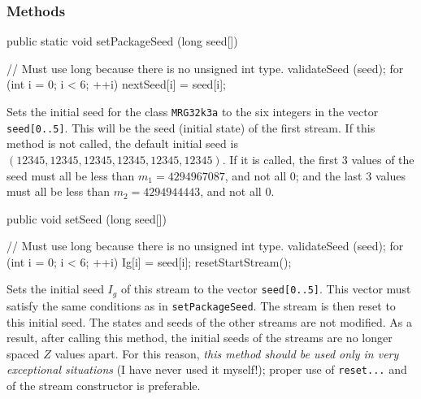 \subsubsection* {Methods}
\begin{code}

   public static void setPackageSeed (long seed[]) \begin{hide} {
      // Must use long because there is no unsigned int type.
      validateSeed (seed);
      for (int i = 0; i < 6;  ++i)
         nextSeed[i] = seed[i];
   }\end{hide}
\end{code}
  \begin{tabb}  Sets the initial seed for the class \texttt{MRG32k3a} to the
   six integers in the vector \texttt{seed[0..5]}.
   This will be the seed (initial state) of the first stream.
   If this method is not called, the default initial seed
   is $(12345, 12345, 12345, 12345, 12345, 12345)$.
   If it is called, the first 3 values of the seed must all be
   less than $m_1 = 4294967087$, and not all 0;
   and the last 3 values
   must all be less than $m_2 = 4294944443$, and not all 0.
 \end{tabb}
\begin{htmlonly}
\end{htmlonly}
\begin{code}

   public void setSeed (long seed[]) \begin{hide} {
      // Must use long because there is no unsigned int type.
      validateSeed (seed);
      for (int i = 0; i < 6;  ++i)
         Ig[i] = seed[i];
      resetStartStream();
   }\end{hide}
\end{code}
 \begin{tabb}  Sets the initial seed $I_g$ of this stream
  to the vector \texttt{seed[0..5]}.  This vector must satisfy the same
  conditions as in \texttt{setPackageSeed}.
  The stream is then reset to this initial seed.
  The states and seeds of the other streams are not modified.
  As a result, after calling this method, the initial seeds
  of the streams are no longer spaced $Z$ values apart.
  For this reason, \emph{this method should be used only in very
  exceptional situations} (I have never used it myself!);
  proper use of \texttt{reset...}
  and of the stream constructor is preferable.
 \end{tabb}
\begin{htmlonly}
\end{htmlonly}
